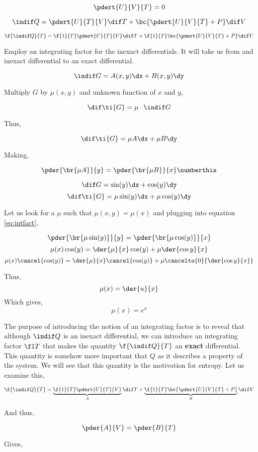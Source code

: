 \documentclass{article}
\begin{document}
\[ \pdert{U}{V}{T} = 0 \]

\[ \indif Q = \pdert{U}{T}{V} \dif T + \bc{\pdert{U}{V}{T} + P}\dif V \]

\[ \f{\indif Q}{T} = \f{1}{T}\pdert{U}{T}{V} \dif T + \f{1}{T}\bc{\pdert{U}{V}{T} + P}\dif V \]

Employ an integrating factor for the inexact differentials. It will take us from and inexact differential to an exact differential.


\[ \indif G = A(x,y)\dx + B(x,y)\dy \]

Multiply $G$ by $\mu(x,y)$ and unknown function of $x$ and $y$,

\[ \dif \ti{G} = \mu \cdot \indif G\]

Thus,

\[ \dif \ti{G} = \mu A \dx + \mu B \dy \]

Making,

\[ \pder{\br{\mu A}}{y} = \pder{\br{\mu B}}{x} \numberthis \label{eq:intfact} \]


\[ \dif G = \sin(y) \dx + \cos(y) \dy \]
\[ \dif \ti{G} = \mu\sin(y) \dx + \mu\cos(y) \dy \]

Let us look for a $\mu$ such that $\mu(x,y) = \mu(x)$ and plugging into equation \eqref{eq:intfact},

\[ \pder{\br{\mu \sin(y)}}{y} = \pder{\br{\mu \cos(y)}}{x} \]
\[ \mu(x)\cos(y) = \der{\mu}{x}\cos(y) + \mu \der{\cos{y}}{x} \]
\[ \mu(x)\cancel{\cos(y)} = \der{\mu}{x}\cancel{\cos(y)} + \mu \cancelto{0}{\der{\cos{y}}{x}} \]

Thus,
\[ \mu(x) = \der{u}{x} \]
Which gives,
\[ \mu(x) = e^x \]

The purpose of introducing the notion of an integrating factor is to reveal that although $\indif Q$ is an inexact differential, we can introduce an integrating factor $\f1T$ that makes the quantity $\f{\indif Q}{T}$ an \textbf{exact} differential. This quantity is somehow more important that $Q$ as it describes a property of the system. We will see that this quantity is the motivation for entropy. Let us examine this,

\[ \f{\indif Q}{T} = \underbrace{\f{1}{T}\pdert{U}{T}{V}}_{A} \dif T + \underbrace{\f{1}{T}\bc{\pdert{U}{V}{T} + P}}_{B}\dif V \]

And thus,

\[ \pder{A}{V} = \pder{B}{T} \]

Gives,
\end{document}
